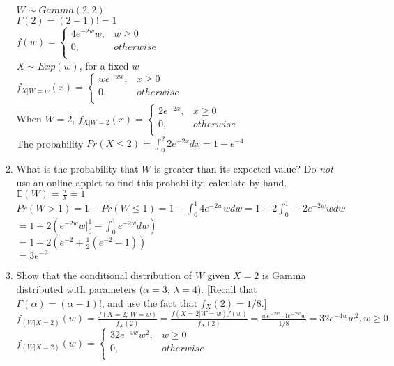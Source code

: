 \documentclass[11pt]{article}
\begin{document}
\begin{enumerate}[label=\textbf{Question \arabic*:},start=1]
\begin{enumerate}
$W \sim Gamma(2, 2)$ \\
$\Gamma(2) = (2-1)! = 1$ \\
$f(w) = \begin{cases}
		4 e^{-2w} w, & w \geq 0 \\ 
		0, & otherwise\\
		\end{cases}$\\
		
$X \sim Exp(w)$, for a fixed $w$ \\
$f_{X | W = w}(x) = \begin{cases}
		w e^{-wx}, & x \geq 0 \\ 
		0, & otherwise\\
		\end{cases}$\\


When $W = 2$, $f_{X | W = 2}(x) = \begin{cases}
		2 e^{-2x}, & x \geq 0 \\ 
		0, & otherwise\\
		\end{cases}$\\
		
The probability $Pr(X \leq 2) = \int_{0}^{2} 2 e^{-2x} dx = 1 - e^{-4}$\\


\item What is the probability that $W$ is greater than its expected value? Do {\em not} use an online applet to find this probability; calculate by hand.\\

$\mathbb{E}(W) = \frac{\alpha}{\lambda} = 1$ \\
$Pr(W > 1) = 1 - Pr(W \leq 1) = 1 - \int_{0}^{1} 4 e^{-2w} w dw = 1 + 2 \int_{0}^{1} -2 e^{-2w} w dw$ \\
$ = 1 + 2 ( e^{-2w} w |_{0}^{1} - \int_{0}^{1} e^{-2w}dw ) $\\
$ = 1 + 2 ( e^{-2} + \frac{1}{2} (e^{-2} - 1))$ \\
$ = 3 e^{-2} $\\ 


\item Show that the conditional distribution of $W$ given $X=2$ is Gamma distributed with parameters ($\alpha=3,\ \lambda=4$). [Recall that $\Gamma(\alpha) = (\alpha-1)!$, and use the fact that $f_X(2) = 1/8$.]\\

$f_{(W | X = 2)}(w) = \frac{f(X=2,\ W=w)}{f_X(2)} = \frac{f(X=2|W=w) f(w)}{f_X(2)} =  \frac{w e^{-2w} \cdot 4 e^{-2w} w}{1/8} = 32 e^{-4w} w^2 , w \geq 0$\\
$f_{(W | X = 2)}(w) =\begin{cases}
		32 e^{-4w} w^2, & w \geq 0 \\ 
		0, & otherwise\\
		\end{cases}$\\


\end{enumerate}
\end{enumerate}
\end{document}
